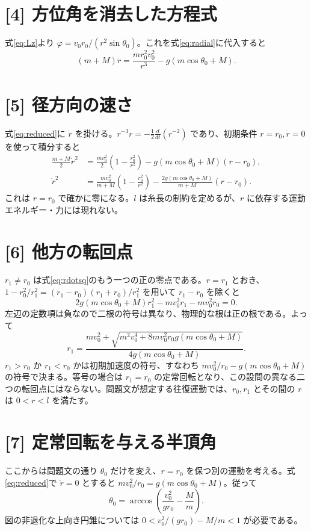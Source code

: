 \documentclass[11pt,a4paper]{article}
\begin{document}
\section*{[4] 方位角を消去した方程式}
式\eqref{eq:Lz}より $\dot\varphi=v_0r_0/(r^2\sin\theta_0)$。これを式\eqref{eq:radial}に代入すると
\begin{equation}
 \boxed{(m+M)\ddot r=\frac{mr_0^2v_0^2}{r^3}
 -g(m\cos\theta_0+M).} \label{eq:reduced}
\end{equation}

\section*{[5] 径方向の速さ}
式\eqref{eq:reduced}に $\dot r$ を掛ける。$r^{-3}\dot r=-\frac12\frac{d}{dt}(r^{-2})$ であり、初期条件 $r=r_0,\dot r=0$ を使って積分すると
\begin{align}
 \frac{m+M}{2}\dot r^{2}
 &=\frac{m v_0^2}{2}\left(1-\frac{r_0^2}{r^2}\right)
 -g(m\cos\theta_0+M)(r-r_0),\\
 \dot r^{2}
 &=\boxed{\frac{m v_0^2}{m+M}\left(1-\frac{r_0^2}{r^2}\right)
 -\frac{2g(m\cos\theta_0+M)}{m+M}(r-r_0).} \label{eq:rdotsq}
\end{align}
これは $r=r_0$ で確かに零になる。$l$ は糸長の制約を定めるが、$r$ に依存する運動エネルギー・力には現れない。

\section*{[6] 他方の転回点}
$r_1\ne r_0$ は式\eqref{eq:rdotsq}のもう一つの正の零点である。$r=r_1$ とおき、$1-r_0^2/r_1^2=(r_1-r_0)(r_1+r_0)/r_1^2$ を用いて $r_1-r_0$ を除くと
\[
 2g(m\cos\theta_0+M)r_1^2-mv_0^2r_1-mv_0^2r_0=0.
\]
左辺の定数項は負なので二根の符号は異なり、物理的な根は正の根である。よって
\begin{equation}
 \boxed{r_1=\frac{mv_0^2+\sqrt{m^2v_0^4+8m v_0^2r_0g(m\cos\theta_0+M)}}{4g(m\cos\theta_0+M)}.} \label{eq:r1}
\end{equation}
$r_1>r_0$ か $r_1<r_0$ かは初期加速度の符号、すなわち $mv_0^2/r_0-g(m\cos\theta_0+M)$ の符号で決まる。等号の場合は $r_1=r_0$ の定常回転となり、この設問の異なる二つの転回点にはならない。問題文が想定する往復運動では、$r_0,r_1$ とその間の $r$ は $0<r<l$ を満たす。

\section*{[7] 定常回転を与える半頂角}
ここからは問題文の通り $\theta_0$ だけを変え、$r=r_0$ を保つ別の運動を考える。式\eqref{eq:reduced}で $\ddot r=0$ とすると $mv_0^2/r_0=g(m\cos\theta_0+M)$。従って
\begin{equation}
 \boxed{\theta_0=\arccos\!\left(\frac{v_0^2}{gr_0}-\frac{M}{m}\right).} \label{eq:theta}
\end{equation}
図の非退化な上向き円錐については $0<v_0^2/(gr_0)-M/m<1$ が必要である。
\end{document}
